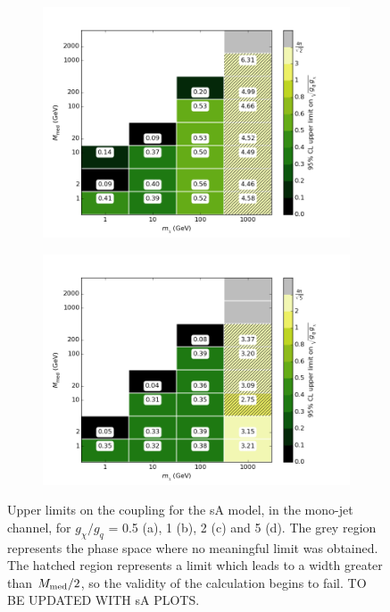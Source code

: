 \begin{figure}[h]
\begin{subfigure}[t]{0.45\textwidth}
      \includegraphics[width=1.\textwidth]{figures/grid_basepoints_SVD_rat2_monojet.png}
      \caption{}
    \end{subfigure}
    \begin{subfigure}[t]{0.45\textwidth}
      \centering
      \includegraphics[width=1.\textwidth]{figures/grid_basepoints_SVD_rat5_monojet.png}
      \caption{}
    \end{subfigure}
    \caption{Upper limits on the coupling for the sA model, in the mono-jet channel, for $g_{\chi} / g_q$ = 0.5 (a), 1 (b), 2 (c) and 5 (d). The grey region represents the phase space where no meaningful limit was obtained. The hatched region represents a limit which leads to a width greater than $M_{\mathrm{med}} / 2$, so the validity of the calculation begins to fail. TO BE UPDATED WITH sA PLOTS.}
    \label{fig:Monojet_SVD_couplinglimit}
\end{figure}

